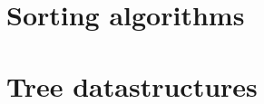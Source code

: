 \begin{appendices}

    \section{Sorting algorithms}

    

    

    

    

    \section{Tree datastructures}

    

    

    

\end{appendices}
